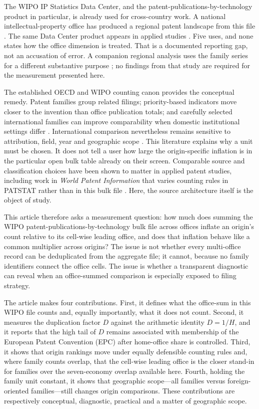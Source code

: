 \documentclass[a4paper,fleqn]{cas-dc}
\begin{document}
The WIPO IP Statistics Data Center, and the patent-publications-by-technology
product in particular, is already used for cross-country work. A national
intellectual-property office has produced a regional patent landscape from
this file \citep{ipos2024seasia}. The same Data Center product appears in
applied studies \citep{akkucuk2016patent,hartmann2021georgia,
ijirshar2025innovation,ildiakov2025assessing}. Five uses, and none states
how the office dimension is treated. That is a documented reporting gap, not
an accusation of error. A companion regional analysis uses the family series
for a different substantive purpose \citep{khan2026jseae}; no findings from
that study are required for the measurement presented here.

The established OECD and WIPO counting canon provides the conceptual remedy.
Patent families group related filings; priority-based indicators move closer
to the invention than office publication totals; and carefully selected
international families can improve comparability when domestic institutional
settings differ \citep{oecd2009manual,martinez2010insight,dernis2004triadic,
derassenfosse2013worldwide}. International comparison nevertheless remains
sensitive to attribution, field, year and geographic scope
\citep{hascic2015comparisons}. This literature explains why a unit must be
chosen. It does not tell a user how large the origin-specific inflation is in
the particular open bulk table already on their screen. Comparable source and
classification choices have been shown to matter in applied patent studies,
including work in \emph{World Patent Information} that varies counting rules
in PATSTAT rather than in this bulk file \citep{pasimeni2019assessing}. Here,
the source architecture itself is the object of study.

This article therefore asks a measurement question: how much does summing the
WIPO patent-publications-by-technology bulk file across offices inflate an
origin's count relative to its cell-wise leading office, and does that
inflation behave like a common multiplier across origins? The issue is not
whether every multi-office record can be deduplicated from the aggregate file;
it cannot, because no family identifiers connect the office cells. The issue
is whether a transparent diagnostic can reveal when an office-summed
comparison is especially exposed to filing strategy.

The article makes four contributions. First, it defines what the office-sum
in this WIPO file counts and, equally importantly, what it does not count.
Second, it measures the duplication factor $D$ against the arithmetic identity
$D=1/H$, and it reports that the high tail of $D$ remains associated with
membership of the European Patent Convention (EPC) after home-office share is
controlled. Third, it shows that origin rankings move under
equally defensible counting rules and, where family counts overlap, that the
cell-wise leading office is the closer stand-in for families over the
seven-economy overlap available here. Fourth, holding the family unit
constant, it shows that geographic scope---all families versus
foreign-oriented families---still changes origin comparisons. These
contributions are respectively conceptual, diagnostic, practical and a
matter of geographic scope.
\end{document}
